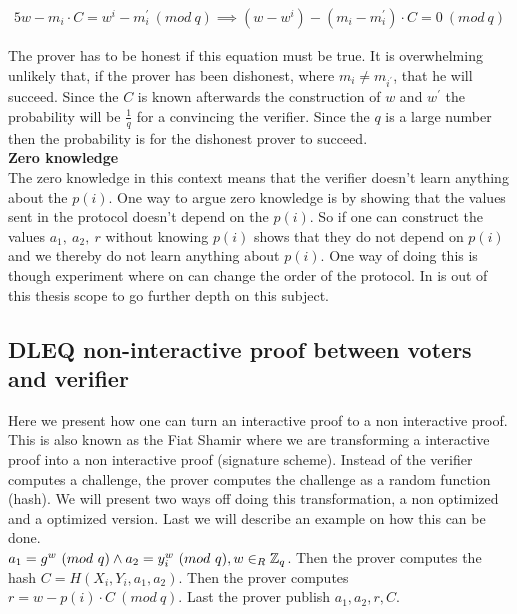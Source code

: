 \begin{alignat*}{5}
w-m_i \cdot C = w^i-m_i^{'}\ (mod\ q) \implies (w-w^i)-(m_i - m_i^{'})  \cdot  C = 0 \ (mod\ q) 
\end{alignat*}


\noindent
The prover has to be honest if this equation must be true. It is overwhelming unlikely that, if the prover has been dishonest, where $m_i \neq m_{i^{'}}$, that he will succeed. Since the $C$ is known afterwards the construction of $w$ and $w^{'}$ the probability will be \begin{math} \frac{1}{q}\end{math} for a convincing the verifier. Since the $q$ is a large number then the probability is for the dishonest prover to succeed.\\


\noindent
\textbf{Zero knowledge}\\
The zero knowledge in this context means that the verifier doesn't learn anything about the $p(i)$. One way to argue zero knowledge is by showing that the values sent in the protocol doesn't depend on the $p(i)$. So if one can construct the values $a_1, \ a_2, \ r$  without knowing  $p(i)$  shows that they do not depend on $p(i)$ and we thereby do not learn anything about $p(i)$. One way of doing this is though experiment where on can change the order of the protocol. In is out of this thesis scope to go further depth on this subject.\\

\subsection{DLEQ non-interactive proof between voters and verifier}
Here we present how one can turn an interactive proof to a non interactive proof. This is also known as the Fiat Shamir where we are transforming a interactive proof into a non interactive proof (signature scheme). Instead of the verifier computes a challenge, the prover computes the challenge as a random function (hash).  We will present two ways off doing this transformation, a non optimized and a optimized version. Last we will describe an example on how this can be done.\\


 \begin{math}a_1=g^w \ (mod\ q)  \land a_2=y_i^w \ (mod\ q),  w\in_R \Z_q \end{math}. Then the prover computes the hash \begin{math}C=H(X_i,Y_i,a_1,a_2) \end{math}. Then the prover computes  \begin{math}r=w-p(i)  \cdot  C \ (mod\ q)\end{math}. Last the prover publish \begin{math}a_1, a_2,r,C\end{math}. \\

